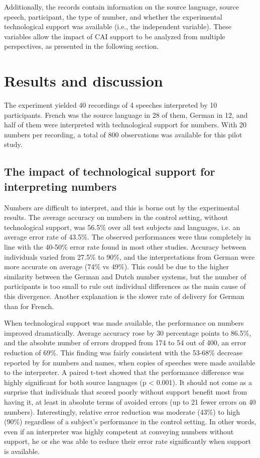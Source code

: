 \documentclass[output=paper]{langsci/langscibook}
\begin{document}
Additionally, the records contain information on the source language, source speech, participant, the type of number, and whether the experimental technological support was available (i.e., the independent variable). These variables allow the impact of CAI support to be analyzed from multiple perspectives, as presented in the following section.

\section{Results and discussion}
The experiment yielded 40 recordings of 4 speeches interpreted by 10 participants. French was the source language in 28 of them, German in 12, and half of them were interpreted with technological support for numbers. With 20 numbers per recording, a total of 800 observations was available for this pilot study.

\subsection{The impact of technological support for interpreting numbers}
Numbers are difficult to interpret, and this is borne out by the experimental results. The average accuracy on numbers in the control setting, without technological support, was 56.5\% over all test subjects and languages, i.e. an average error rate of 43.5\%. The observed performances were thus completely in line with the 40-50\% error rate found in most other studies. Accuracy between individuals varied from 27.5\% to 90\%, and the interpretations from German were more accurate on average (74\% vs 49\%). This could be due to the higher similarity between the German and Dutch number systems, but the number of participants is too small to rule out individual differences as the main cause of this divergence. Another explanation is the slower rate of delivery for German than for French.

When technological support was made available, the performance on numbers improved dramatically. Average accuracy rose by 30 percentage points to 86.5\%, and the absolute number of errors dropped from 174 to 54 out of 400, an error reduction of 69\%. This finding was fairly consistent with the 53-68\% decrease reported by \citet{Lamberger-Felber2001} for numbers and names, when copies of speeches were made available to the interpreter. A paired t-test showed that the performance difference was highly significant for both source languages (p < 0.001). It should not come as a surprise that individuals that scored poorly without support benefit most from having it, at least in absolute terms of avoided errors (up to 21 fewer errors on 40 numbers). Interestingly, relative error reduction was moderate (43\%) to high (90\%) regardless of a subject’s performance in the control setting. In other words, even if an interpreter was highly competent at conveying numbers without support, he or she was able to reduce their error rate significantly when support is available.
\end{document}
